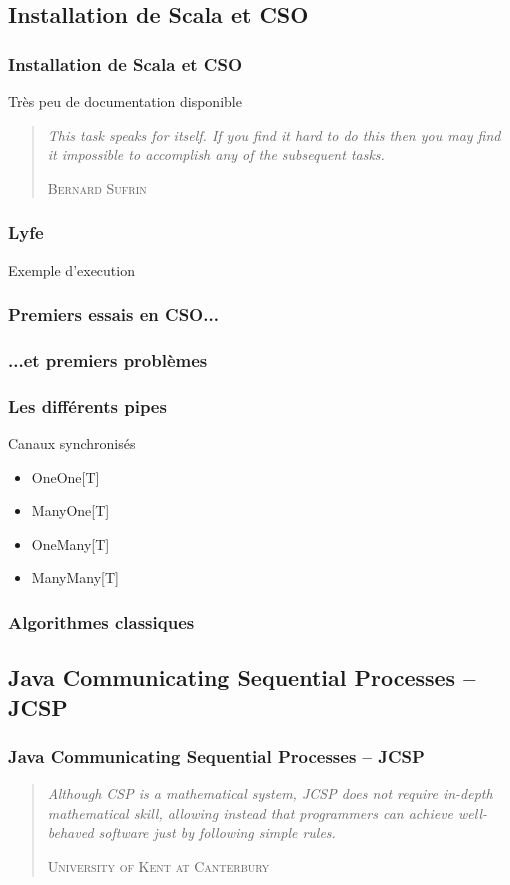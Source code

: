 \documentclass[slidetop,11pt]{beamer}
\begin{document}
\subsection{Installation de Scala et CSO}
\begin{frame} 
\frametitle{Installation de Scala et CSO}
Très peu de documentation disponible
\pause
\begin{quotation}
\textit{\og This task speaks for itself. If you find it hard to do this then you may find it impossible
to accomplish any of the subsequent tasks.\fg}
\begin{flushright}
\textsc{Bernard Sufrin}
\end{flushright}
\end{quotation}
\end{frame}

\begin{frame} 
\frametitle{Lyfe}
Exemple d'execution
\end{frame}

\begin{frame} 
\frametitle{Premiers essais en CSO...}

\end{frame}

\begin{frame} 
\frametitle{...et premiers problèmes}

\end{frame}

\begin{frame} 
\frametitle{Les différents pipes}
\begin{block}{Canaux synchronisés}
\begin{itemize}[<+->]
\item \textsf{OneOne[T]} 
\item \textsf{ManyOne[T]} 
\item \textsf{OneMany[T]} 
\item \textsf{ManyMany[T]} 
\end{itemize}
\end{block}
\end{frame}

\begin{frame} 
\frametitle{Algorithmes classiques}

\end{frame}

\subsection{Java Communicating Sequential Processes – JCSP}
\begin{frame}
\frametitle{Java Communicating Sequential Processes – JCSP}
\begin{quotation}
\textit{\og Although CSP is a mathematical system, JCSP does not require in-depth mathematical skill, allowing instead that programmers can achieve well-behaved software just by following simple rules.\fg}
\begin{flushright}
\textsc{University of Kent at Canterbury}
\end{flushright}
\end{quotation}
\end{frame}
\end{document}
